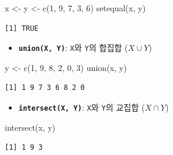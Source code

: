 \documentclass[
  11pt,
]{krantz}
\newenvironment{Shaded}{\begin{snugshade}}{\end{snugshade}}
\newcommand{\DecValTok}[1]{\textcolor[rgb]{0.06,0.06,0.06}{#1}}
\newcommand{\FunctionTok}[1]{\textcolor[rgb]{0,0,0}{#1}}
\newcommand{\NormalTok}[1]{#1}
\newcommand{\OtherTok}[1]{\textcolor[rgb]{0.37,0.37,0.37}{#1}}
\providecommand{\tightlist}{%
  \setlength{\itemsep}{0pt}\setlength{\parskip}{0pt}}
\begin{document}
\footnotesize

\begin{Shaded}
\begin{Highlighting}[]
\NormalTok{x }\OtherTok{\textless{}{-}}\NormalTok{ y }\OtherTok{\textless{}{-}} \FunctionTok{c}\NormalTok{(}\DecValTok{1}\NormalTok{, }\DecValTok{9}\NormalTok{, }\DecValTok{7}\NormalTok{, }\DecValTok{3}\NormalTok{, }\DecValTok{6}\NormalTok{)}
\FunctionTok{setequal}\NormalTok{(x, y)}
\end{Highlighting}
\end{Shaded}

\begin{verbatim}
[1] TRUE
\end{verbatim}

\normalsize

\begin{itemize}
\tightlist
\item
  \textbf{\texttt{union(X,\ Y)}}: \texttt{X}와 \texttt{Y}의 합집합 (\(X \cup Y\))
\end{itemize}

\footnotesize

\begin{Shaded}
\begin{Highlighting}[]
\NormalTok{y }\OtherTok{\textless{}{-}} \FunctionTok{c}\NormalTok{(}\DecValTok{1}\NormalTok{, }\DecValTok{9}\NormalTok{, }\DecValTok{8}\NormalTok{, }\DecValTok{2}\NormalTok{, }\DecValTok{0}\NormalTok{, }\DecValTok{3}\NormalTok{)}
\FunctionTok{union}\NormalTok{(x, y)}
\end{Highlighting}
\end{Shaded}

\begin{verbatim}
[1] 1 9 7 3 6 8 2 0
\end{verbatim}

\normalsize

\begin{itemize}
\tightlist
\item
  \textbf{\texttt{intersect(X,\ Y)}}: \texttt{X}와 \texttt{Y}의 교집합 (\(X \cap Y\))
\end{itemize}

\footnotesize

\begin{Shaded}
\begin{Highlighting}[]
\FunctionTok{intersect}\NormalTok{(x, y)}
\end{Highlighting}
\end{Shaded}

\begin{verbatim}
[1] 1 9 3
\end{verbatim}
\end{document}
